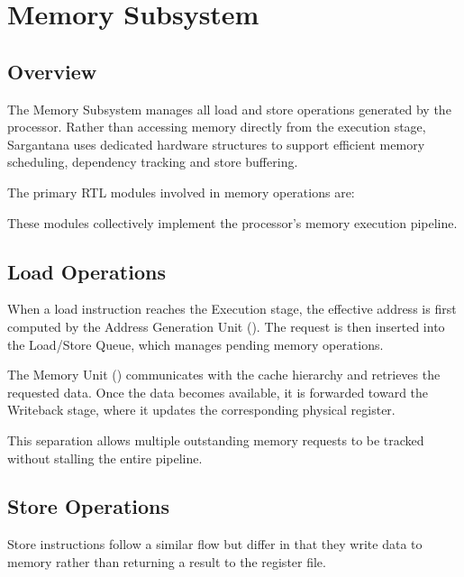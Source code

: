 \chapter{Memory Subsystem}

\section{Overview}

The Memory Subsystem manages all load and store operations generated by the processor.
Rather than accessing memory directly from the execution stage, Sargantana uses dedicated
hardware structures to support efficient memory scheduling, dependency tracking and store
buffering.

The primary RTL modules involved in memory operations are:

\begin{rtlrefs}
\end{rtlrefs}

These modules collectively implement the processor's memory execution pipeline.

\section{Load Operations}

When a load instruction reaches the Execution stage, the effective address is first computed by
the Address Generation Unit (). The request is then inserted into the Load/Store
Queue, which manages pending memory operations.

The Memory Unit () communicates with the cache hierarchy and retrieves the
requested data. Once the data becomes available, it is forwarded toward the Writeback stage,
where it updates the corresponding physical register.

This separation allows multiple outstanding memory requests to be tracked without stalling the
entire pipeline.

\section{Store Operations}

Store instructions follow a similar flow but differ in that they write data to memory rather than
returning a result to the register file.

